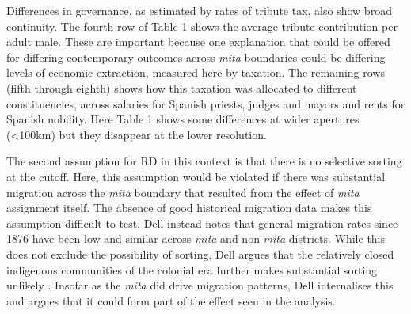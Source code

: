 \documentclass[12pt]{article}
\begin{document}
Differences in governance, as estimated by rates of tribute tax, also show broad continuity. The fourth row of Table 1 shows the average tribute contribution per adult male. These are important because one explanation that could be offered for differing contemporary outcomes across \emph{mita} boundaries could be differing levels of economic extraction, measured here by taxation. The remaining rows (fifth through eighth) shows how this taxation was allocated to different constituencies, across salaries for Spanish priests, judges and mayors and rents for Spanish nobility. Here Table 1 shows some differences at wider apertures (\textless 100km) but they disappear at the lower resolution. 

The second assumption for RD in this context is that there is no selective sorting at the cutoff. Here, this assumption would be violated if there was substantial migration across the \emph{mita} boundary that resulted from the effect of \emph{mita} assignment itself. The absence of good historical migration data makes this assumption difficult to test. Dell instead notes that general migration rates since 1876 have been low and similar across \emph{mita} and non-\emph{mita} districts. While this does not exclude the possibility of sorting, Dell argues that the relatively closed indigenous communities of the colonial era further makes substantial sorting unlikely \autocite{Morner1978PerfilColoni}. Insofar as the \emph{mita} did drive migration patterns, Dell internalises this and argues that it could form part of the effect seen in the analysis.
\end{document}
